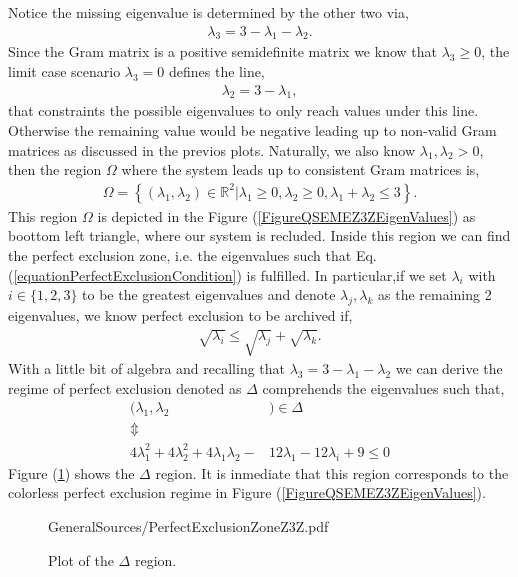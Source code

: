 \documentclass[12pt,letterpaper]{article}
\begin{document}
\begin{multicols}{2}
Notice the missing eigenvalue is determined by the other two via,
\begin{align*}
	\lambda_3=3-\lambda_1-\lambda_2.
\end{align*}
Since the Gram matrix is a positive semidefinite matrix we know that $\lambda_3\geq0$, the limit case scenario $\lambda_3=0$ defines the line,
\begin{align*}
\lambda_2=3-\lambda_1,
\end{align*}
that constraints the possible eigenvalues to only reach values under this line. Otherwise the remaining value would be negative leading up to non-valid Gram matrices as discussed in the previos plots. Naturally, we also know $\lambda_1,\lambda_2>0$, then the region $\Omega$ where the system leads up to consistent Gram matrices is,
\begin{align*}
	\Omega=\left\{(\lambda_1,\lambda_2)\in\mathbb{R}^2\left|\lambda_1\geq0,\lambda_2\geq0,\lambda_1+\lambda_2\leq3\right.\right\}.
\end{align*}
This region $\Omega$ is depicted in the Figure (\ref{FigureQSEMEZ3ZEigenValues}) as boottom left triangle, where our system is recluded. Inside this region we can find the perfect exclusion zone, i.e. the eigenvalues such that Eq.(\ref{equationPerfectExclusionCondition}) is fulfilled. In particular,if we set $\lambda_i$ with $i\in\{1,2,3\}$ to be the greatest eigenvalues and denote $\lambda_j,\lambda_k$ as the remaining 2 eigenvalues, we know perfect exclusion to be archived if,
\begin{align*}
	\sqrt{\lambda_i}\leq \sqrt{\lambda_j}+\sqrt{\lambda_k}.
\end{align*}
With a little bit of algebra and recalling that $\lambda_3=3-\lambda_1-\lambda_2$ we can derive the regime of perfect exclusion denoted as $\Delta$ comprehends the eigenvalues such that,
\begin{align*}
	(\lambda_1,\lambda_2&)\in \Delta\\
	\Updownarrow& \\
	4\lambda_1^2 + 4\lambda_2^2 + 4\lambda_1\lambda_2 - &12\lambda_1 - 12\lambda_i + 9 \leq 0
\end{align*}
Figure (\ref{FigurePerfectExclusionZ3Z}) shows the $\Delta$ region. It is inmediate that this region corresponds to the colorless perfect exclusion regime in Figure (\ref{FigureQSEMEZ3ZEigenValues}).
\begin{figure}[H]
	\centering
	\begin{overpic}[width=0.5\textwidth, trim={1.8cm 0.8cm 2cm 2cm}, clip]{GeneralSources/PerfectExclusionZoneZ3Z.pdf}
	\end{overpic}
	\caption{Plot of the $\Delta$ region.}
	\label{FigurePerfectExclusionZ3Z}
\end{figure}


\end{multicols}
\end{document}
